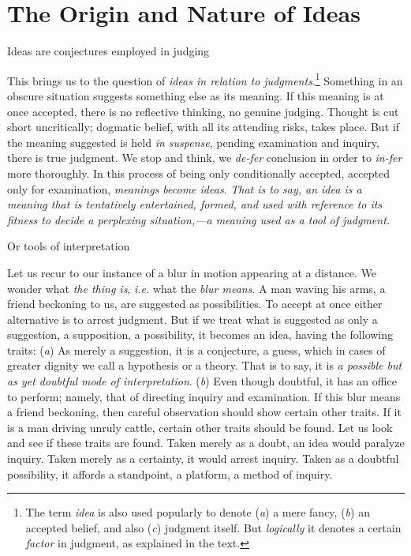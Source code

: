 \documentclass[letterpaper]{book}
\begin{document}
\section{The Origin and Nature of Ideas}

Ideas are conjectures employed in judging

This brings us to the question of \emph{ideas in relation to
judgments}.\footnote{
The term \emph{idea} is also used popularly to denote (\emph{a}) a mere
fancy, (\emph{b}) an accepted belief, and also (\emph{c}) judgment
itself. But \emph{logically} it denotes a certain \emph{factor} in
judgment, as explained in the text.
}
Something in an obscure situation
suggests
something else as its meaning. If this meaning is at once accepted,
there is no reflective thinking, no genuine judging. Thought is cut
short uncritically; dogmatic belief, with all its attending risks, takes
place. But if the meaning suggested is held \emph{in suspense}, pending
examination and inquiry, there is true judgment. We stop and think, we
\emph{de-fer} conclusion in order to \emph{in-fer} more thoroughly. In
this process of being only conditionally accepted, accepted only for
examination, \emph{meanings become ideas}. \emph{That is to say, an idea
is a meaning that is tentatively entertained, formed, and used with
reference to its fitness to decide a perplexing situation,---a meaning
used as a tool of judgment.}

Or tools of interpretation

Let us recur to our instance of a blur in motion appearing at a
distance. We wonder what \emph{the thing is}, \emph{i.e.} what the
\emph{blur means}. A man waving his arms, a friend beckoning to us, are
suggested as possibilities. To accept at once either alternative is to
arrest judgment. But if we treat what is suggested as only a suggestion,
a supposition, a possibility, it becomes an idea, having the following
traits: (\emph{a}) As merely a suggestion, it is a conjecture, a guess,
which in cases of greater dignity we call a hypothesis or a theory. That
is to say, it is \emph{a possible but as yet doubtful mode of
interpretation}. (\emph{b}) Even though doubtful, it has an office to
perform; namely, that of directing inquiry and examination. If this blur
means a friend beckoning, then careful observation should show certain
other traits. If it is a man driving unruly cattle, certain other traits
should be found. Let us look and see if these traits are found. Taken
merely as a doubt, an idea would paralyze inquiry. Taken merely as a
certainty, it would
arrest
inquiry. Taken as a doubtful possibility, it affords a standpoint, a
platform, a method of inquiry.
\end{document}
